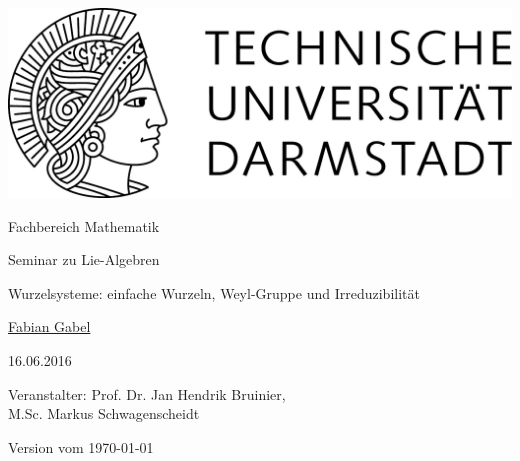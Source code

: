 \begin{titlepage}
  \begin{center}
    \vspace{1cm}
    \includegraphics[width=0.5\linewidth]{TU_Darmstadt_Logo.pdf}
    \vspace{12pt}
    
    \large{Fachbereich Mathematik}
    \vspace{2cm}
    
    \large{Seminar zu Lie-Algebren}
    \vspace{2cm}

    \huge{Wurzelsysteme: einfache Wurzeln, Weyl-Gruppe und Irreduzibilität}
    
    \vspace*{2cm}    
    
		\large
                \href{mailto:gabel@mathematik.tu-darmstadt.de}{Fabian Gabel}
    \vspace*{.5cm}

    16.06.2016 \\
    \vspace*{1cm}

    Veranstalter: Prof. Dr. Jan Hendrik Bruinier,  \\
    \hspace{3.0cm}M.Sc. Markus Schwagenscheidt

    \vspace*{.5cm}

    \tiny{Version vom \today}
  \end{center}
\end{titlepage}
\vspace*{\fill}
